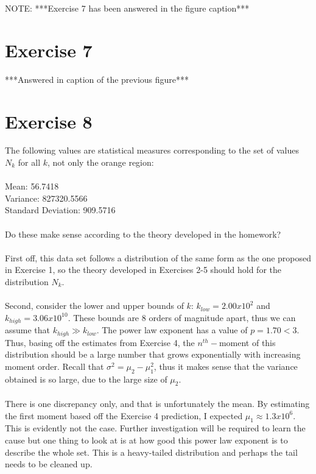 \documentclass{article}
\begin{document}
NOTE: ***Exercise 7 has been answered in the figure caption***


\section{Exercise 7}

***Answered in caption of the previous figure***

\section{Exercise 8}

The following values are statistical measures corresponding to the set of values $N_k$ for all $k$, not only the orange region: \\
\\
Mean: 56.7418\\
Variance: 827320.5566\\
Standard Deviation: 909.5716\\
\\
Do these make sense according to the theory developed in the homework? \\
\\
First off, this data set follows a distribution of the same form as the one proposed in Exercise 1, so the theory developed in Exercises 2-5 should hold for the distribution $N_k$.  \\
\\
Second, consider the lower and upper bounds of $k$: $k_{low} = 2.00x10^2$ and $k_{high} = 3.06x10^{10}$. These bounds are 8 orders of magnitude apart, thus we can assume that $k_{high} \gg k_{low}$. The power law exponent has a value of $p =  1.70 < 3$. Thus, basing off the estimates from Exercise 4, the $n^{th}-$moment of this distribution should be a large number that grows exponentially with increasing moment order. Recall that $\sigma^2 = \mu_2 - \mu_1^2$, thus it makes sense that the variance obtained is so large, due to the large size of $\mu_2$. \\
\\
There is one discrepancy only, and that is unfortunately the mean. By estimating the first moment based off the Exercise 4 prediction, I expected $\mu_1 \approx 1.3x10^6$. This is evidently not the case. Further investigation will be required to learn the cause but one thing to look at is at how good this power law exponent is to describe the whole set. This is a heavy-tailed distribution and perhaps the tail needs to be cleaned up.
\\
\end{document}
